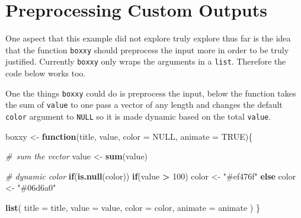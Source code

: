 \documentclass[
  10pt,
]{krantz}
\makeatletter
\newenvironment{Shaded}{\begin{snugshade}}{\end{snugshade}}
\newcommand{\CommentTok}[1]{\textcolor[rgb]{0.37,0.37,0.37}{\textit{#1}}}
\newcommand{\ControlFlowTok}[1]{\textcolor[rgb]{0.27,0.27,0.27}{\textbf{#1}}}
\newcommand{\DataTypeTok}[1]{\textcolor[rgb]{0.27,0.27,0.27}{#1}}
\newcommand{\DecValTok}[1]{\textcolor[rgb]{0.06,0.06,0.06}{#1}}
\newcommand{\KeywordTok}[1]{\textcolor[rgb]{0.27,0.27,0.27}{\textbf{#1}}}
\newcommand{\NormalTok}[1]{#1}
\newcommand{\OperatorTok}[1]{\textcolor[rgb]{0.43,0.43,0.43}{\textbf{#1}}}
\newcommand{\OtherTok}[1]{\textcolor[rgb]{0.37,0.37,0.37}{#1}}
\newcommand{\StringTok}[1]{\textcolor[rgb]{0.5,0.5,0.5}{#1}}
\newenvironment{kframe}{%
\medskip{}
\setlength{\fboxsep}{.8em}
 \def\at@end@of@kframe{}%
 \ifinner\ifhmode%
  \def\at@end@of@kframe{\end{minipage}}%
  \begin{minipage}{\columnwidth}%
 \fi\fi%
 \def\FrameCommand##1{\hskip\@totalleftmargin \hskip-\fboxsep
 \colorbox{shadecolor}{##1}\hskip-\fboxsep
     \hskip-\linewidth \hskip-\@totalleftmargin \hskip\columnwidth}%
 \MakeFramed {\advance\hsize-\width
   \@totalleftmargin\z@ \linewidth\hsize
   \@setminipage}}%
 {\par\unskip\endMakeFramed%
 \at@end@of@kframe}
\renewenvironment{Shaded}{\begin{kframe}}{\end{kframe}}
\makeatother
\begin{document}
\hypertarget{shiny-output-preprocess}{%
\section{Preprocessing Custom Outputs}\label{shiny-output-preprocess}}

One aspect that this example did not explore truly explore thus far is the idea that the function \texttt{boxxy} should preprocess the input more in order to be truly justified. Currently \texttt{boxxy} only wraps the arguments in a \texttt{list}. Therefore the code below works too.

\begin{Shaded}
\end{Shaded}

One the things \texttt{boxxy} could do is preprocess the input, below the function takes the sum of \texttt{value} to one pass a vector of any length and changes the default \texttt{color} argument to \texttt{NULL} so it is made dynamic based on the total \texttt{value}.

\begin{Shaded}
\begin{Highlighting}[]
\NormalTok{boxxy <{-}}\StringTok{ }\ControlFlowTok{function}\NormalTok{(title, value, }\DataTypeTok{color =} \OtherTok{NULL}\NormalTok{, }\DataTypeTok{animate =} \OtherTok{TRUE}\NormalTok{)\{}

  \CommentTok{\# sum the vector}
\NormalTok{  value <{-}}\StringTok{ }\KeywordTok{sum}\NormalTok{(value)}

  \CommentTok{\# dynamic color}
  \ControlFlowTok{if}\NormalTok{(}\KeywordTok{is.null}\NormalTok{(color))}
    \ControlFlowTok{if}\NormalTok{(value }\OperatorTok{>}\StringTok{ }\DecValTok{100}\NormalTok{)}
\NormalTok{      color <{-}}\StringTok{ "\#ef476f"}
    \ControlFlowTok{else}
\NormalTok{      color <{-}}\StringTok{ "\#06d6a0"}

  \KeywordTok{list}\NormalTok{(}
    \DataTypeTok{title =}\NormalTok{ title, }
    \DataTypeTok{value =}\NormalTok{ value, }
    \DataTypeTok{color =}\NormalTok{ color, }
    \DataTypeTok{animate =}\NormalTok{ animate}
\NormalTok{  )}
\NormalTok{\}}
\end{Highlighting}
\end{Shaded}
\end{document}
